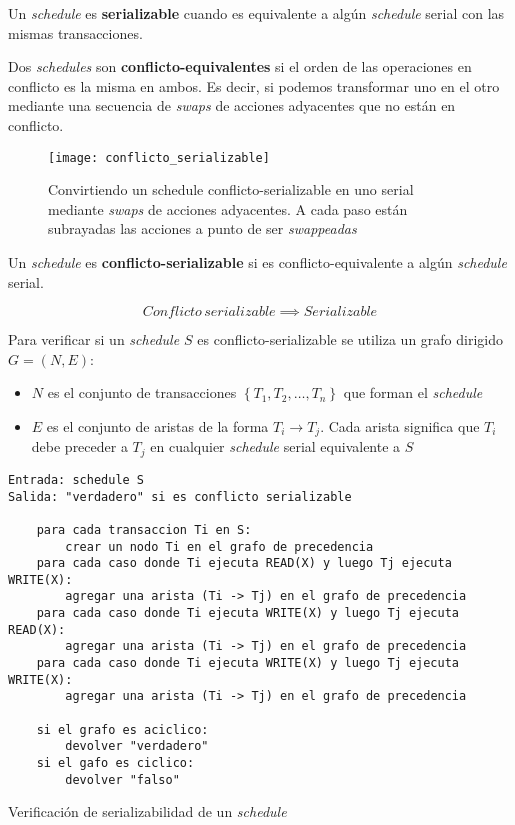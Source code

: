 \documentclass[a4paper, twoside]{article}
\begin{document}
Un \emph{schedule} es \textbf{serializable} cuando es equivalente
a algún \emph{schedule} serial con las mismas transacciones.

Dos \emph{schedules} son \textbf{conflicto-equivalentes} si el orden
de las operaciones en conflicto es la misma en ambos. Es decir, si
podemos transformar uno en el otro mediante una secuencia de \emph{swaps}
de acciones adyacentes que no están en conflicto.

\begin{figure}[H]
\noindent \begin{centering}
\texttt{[image: conflicto\_serializable]}
\par\end{centering}

\protect\caption{Convirtiendo un schedule conflicto-serializable en uno serial mediante
\emph{swaps} de acciones adyacentes. A cada paso están subrayadas
las acciones a punto de ser \emph{swappeadas}}


\end{figure}


Un \emph{schedule} es \textbf{conflicto-serializable} si es conflicto-equivalente
a algún \emph{schedule} serial.

\[
Conflicto\, serializable\implies Serializable
\]


Para verificar si un \emph{schedule $S$ }es conflicto-serializable
se utiliza un grafo dirigido $G=(N,E)$:
\begin{itemize}
\item $N$ es el conjunto de transacciones $\left\{ T_{1},T_{2},\ldots,T_{n}\right\} $
que forman el \emph{schedule}
\item $E$ es el conjunto de aristas de la forma $T_{i}\to T_{j}$. Cada
arista significa que $T_{i}$ debe preceder a $T_{j}$ en cualquier
\emph{schedule} serial equivalente a $S$
\end{itemize}
\begin{algorithm}[H]
\begin{lstlisting}
Entrada: schedule S
Salida: "verdadero" si es conflicto serializable

	para cada transaccion Ti en S:
		crear un nodo Ti en el grafo de precedencia
	para cada caso donde Ti ejecuta READ(X) y luego Tj ejecuta WRITE(X):
		agregar una arista (Ti -> Tj) en el grafo de precedencia
	para cada caso donde Ti ejecuta WRITE(X) y luego Tj ejecuta READ(X):
		agregar una arista (Ti -> Tj) en el grafo de precedencia
	para cada caso donde Ti ejecuta WRITE(X) y luego Tj ejecuta WRITE(X):
		agregar una arista (Ti -> Tj) en el grafo de precedencia
	
	si el grafo es aciclico:
		devolver "verdadero"
	si el gafo es ciclico:
		devolver "falso"
\end{lstlisting}


\protect\caption{Verificación de serializabilidad de un \emph{schedule}}
\end{algorithm}
\end{document}
